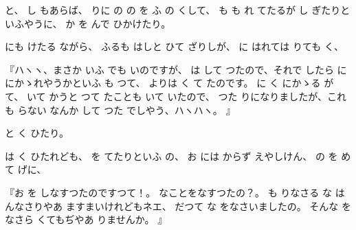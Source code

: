 と、
し
もあらば、
りに
の
の
を
ふ
の
くして、
も
も
れ
てたるが
し
ぎたりといふやうに、
か
を
んで
ひかけたり。

にも
けたる
ながら、
ふるも
はしと
ひて
ざりしが、
に
はれては
りても
く、

『ハヽヽ、まさか
いふ
でも
いのですが、
は
して
つたので、それで
したら
に
にかゝれやうかといふ
も
つて、
よりは
く
て
たのです。
に
く
にかゝる
が
て、
いて
かうと
つて
たことも
いて
いたので、
つた
りになりましたが、これも
らない
なんか
して
つた
でしやう、ハヽハヽ。
』

と
く
ひたり。

は
く
ひたれども、
を
てたりといふ
の、
お
には
からず
えやしけん、
の
を
めて
げに、

『お
を
しなすつたのですつて！。
なことをなすつたの？。
も
りなさる
な
は
んなさりやあ
ますまいけれどもネエ、
だつて
な
をなさいましたの。
そんな
をなさら
くてもぢやあ
りませんか。
』

